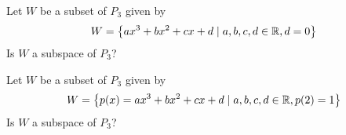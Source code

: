 \begin{ex} Let $W$ be a subset of $P_3$ given by
\[
W = \left\{
ax^3 + bx^2 + cx + d \mid a,b,c,d \in \mathbb{R}, d = 0 \right\}
\]
Is $W$ a subspace of $P_3$?
\end{ex}

\begin{ex} Let $W$ be a subset of $P_3$ given by
\[
W = \left\{
p(x) = ax^3 + bx^2 + cx + d \mid a,b,c,d \in \mathbb{R}, p(2) = 1 \right\}
\]
Is $W$ a subspace of $P_3$?
\end{ex}

